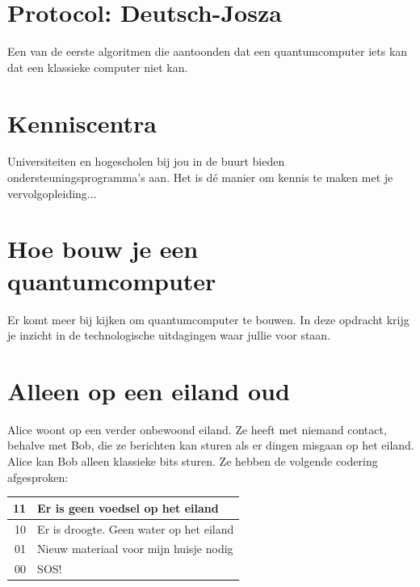 \documentclass[../../main.tex]{subfiles}
\begin{document}
\iffalse%


\section{Protocol: Deutsch-Josza}\label{sec:poDeutsch}
Een van de eerste algoritmen die aantoonden dat een quantumcomputer iets kan dat een  klassieke computer niet kan.


\section{Kenniscentra}
Universiteiten en hogescholen bij jou in de buurt bieden ondersteuningsprogramma's aan. Het is d\'e manier om kennis te maken met je vervolgopleiding... 


\section{Hoe bouw je een quantumcomputer}\label{sec:pobouwqc}
Er komt meer bij kijken om quantumcomputer te bouwen. In deze opdracht krijg je inzicht in de technologische uitdagingen waar jullie voor staan. 



\section{Alleen op een eiland oud}
Alice woont op een verder onbewoond eiland. Ze heeft met niemand contact, behalve met Bob, die ze berichten kan sturen als er dingen misgaan op het eiland. Alice kan Bob alleen klassieke bits sturen. Ze hebben de volgende codering afgesproken: 

\vspace*{12pt}
{\footnotesize
\begin{tabular}{r|l}
11 & Er is geen voedsel op het eiland\\\hline 
10 & Er is droogte. Geen water op het eiland\\\hline  
01 & Nieuw materiaal voor mijn huisje nodig \\\hline 
00 & SOS!
\end{tabular}
}
\vspace*{12pt}
\end{document}
